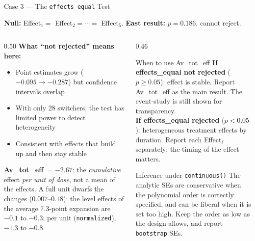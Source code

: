 \documentclass[main.tex]{subfiles}
\begin{document}
\begin{frame}{Case 3 --- The \texttt{effects\_equal} Test}

  \textbf{Null:} Effect$_1 = $ Effect$_2 = \cdots = $ Effect$_5$.
  \textbf{East result:} $p = 0.186$, cannot reject.

  \medskip
  \begin{columns}[T]
    \begin{column}{0.50\textwidth}
      \textbf{What ``not rejected'' means here:}
      \begin{itemize}
        \item Point estimates grow
          ($-0.095 \to -0.287$) but
          confidence intervals overlap
        \item With only 28 switchers, the test
          has limited power to detect heterogeneity
        \item Consistent with effects that build
          up and then stay stable
      \end{itemize}

      \medskip
      \textbf{Av\_tot\_eff} $= -2.67$: the
      \emph{cumulative} effect \emph{per unit of dose},
      not a mean of the effects. A full unit dwarfs the
      changes ($0.007$--$0.18$): the level effects of
      the average $7.3$-point expansion are $-0.1$ to
      $-0.3$; per unit (\texttt{normalized}), $-1.3$ to $-0.8$.
    \end{column}
    \begin{column}{0.46\textwidth}
      \begin{block}{When to use Av\_tot\_eff}
        \footnotesize
        \textbf{If effects\_equal not rejected}
        ($p \geq 0.05$): effect is stable.
        Report Av\_tot\_eff as the main result.
        The event-study is still shown for
        transparency.\\[4pt]
        \textbf{If effects\_equal rejected}
        ($p < 0.05$): heterogeneous treatment
        effects by duration. Report each
        Effect$_\ell$ separately: the
        timing of the effect matters.
      \end{block}

      \smallskip
      \begin{block}{\footnotesize Inference under \texttt{continuous()}}
        \footnotesize
        The analytic SEs are conservative when the polynomial order
        is correctly specified, and can be liberal when it is set
        too high. Keep the order as low as the design allows, and
        report \texttt{bootstrap} SEs.
      \end{block}
    \end{column}
  \end{columns}

\end{frame}
\end{document}
